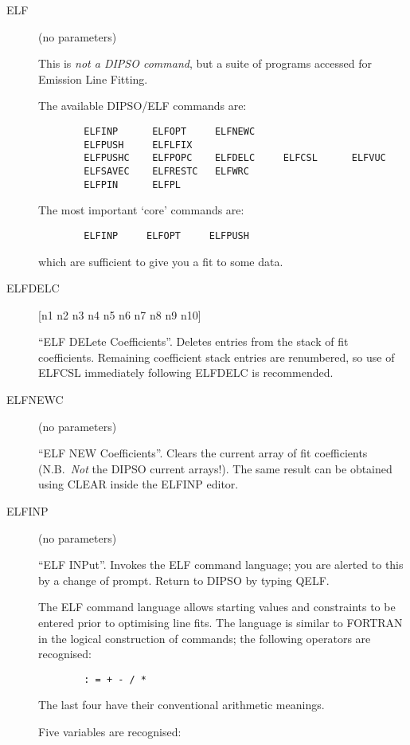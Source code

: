 \begin {description}
\item [ELF] (no parameters)

This is {\em not a DIPSO command}, but a suite of programs accessed for
Emission Line Fitting.

The available DIPSO/ELF commands are:

\begin{verbatim}
        ELFINP      ELFOPT     ELFNEWC
        ELFPUSH     ELFLFIX
        ELFPUSHC    ELFPOPC    ELFDELC     ELFCSL      ELFVUC
        ELFSAVEC    ELFRESTC   ELFWRC
        ELFPIN      ELFPL
\end{verbatim}

The most important `core' commands are:

\begin{verbatim}
        ELFINP     ELFOPT     ELFPUSH
\end{verbatim}

which are sufficient to give you a fit to some data.

\item [ELFDELC] [n1 n2 n3 n4 n5 n6 n7 n8 n9 n10]

``ELF DELete Coefficients''. Deletes entries from the stack of fit
coefficients. Remaining coefficient stack entries are renumbered, so
use of ELFCSL immediately following ELFDELC is recommended.

\item [ELFNEWC] (no parameters)

``ELF NEW Coefficients''. Clears the current array of fit coefficients
(N.B.\ {\em Not} the DIPSO current arrays!). The same result can be
obtained using CLEAR inside the ELFINP editor.

\item [ELFINP] (no parameters)

``ELF INPut''. Invokes the ELF command language; you are alerted to
this by a change of prompt. Return to DIPSO by typing QELF.

The ELF command language allows starting values and constraints to be
entered prior to optimising line fits. The language is similar to
FORTRAN in the logical construction of commands; the following
operators are recognised:

\begin{verbatim}
        : = + - / *
\end{verbatim}

The last four have their conventional arithmetic meanings.

Five variables are recognised:


\end{description}
